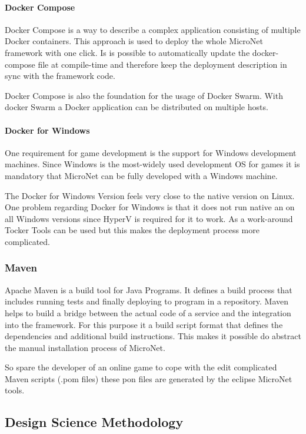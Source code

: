 \paragraph{Docker Compose}

Docker Compose is a way to describe a complex application consisting of multiple
Docker containers. This approach is used to deploy the whole MicroNet framework
with one click. Is is possible to automatically update the docker-compose file
at compile-time and therefore keep the deployment description in sync with the
framework code.

Docker Compose is also the foundation for the usage of Docker Swarm. With docker
Swarm a Docker application can be distributed on multiple hosts. 

\paragraph{Docker for Windows}

One requirement for game development is the support for Windows development
machines. Since Windows is the most-widely used development OS for games it is
mandatory that MicroNet can be fully developed with a Windows machine. 

The Docker for Windows Version feels very close to the native version on Linux.
One problem regarding Docker for Windows is that it does not run native an on
all Windows versions since HyperV is required for it to work. As a work-around
Tocker Tools can be used but this makes the deployment process more complicated.

\subsubsection{Maven}

Apache Maven is a build tool for Java Programs. It defines a build process that
includes running tests and finally deploying to program in a repository. Maven
helps to build a bridge between the actual code of a service and the integration
into the framework. For this purpose it a build script format that defines the
dependencies and additional build instructions. This makes it possible do
abstract the manual installation process of MicroNet. 

So spare the developer of an online game to cope with the edit complicated Maven
scripts (.pom files) these pon files are generated by the eclipse MicroNet
tools.

\subsection{Design Science Methodology}
